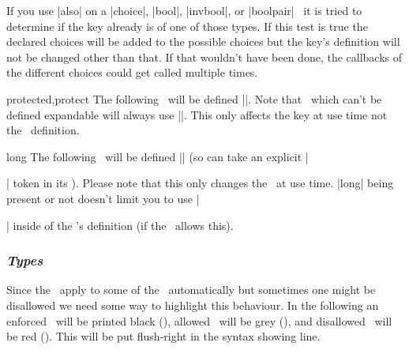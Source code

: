 If you use |also| on a |choice|, |bool|, |invbool|, or |boolpair| \key\ it is
tried to determine if the key already is of one of those types. If this test is
true the declared choices will be added to the possible choices but the key's
definition will not be changed other than that. If that wouldn't have been done,
the callbacks of the different choices could get called multiple times.

\begin{function}[module=expkv-def prefix]{protected,protect}
  The following \key\ will be defined |\protected|. Note that \types\ which
  can't be defined expandable will always use |\protected|. This only affects
  the key at use time not the \key\ definition.
\end{function}

\begin{function}[module=expkv-def prefix]{long}
  The following \key\ will be defined |\long| (so can take an explicit |\par|
  token in its \val). Please note that this only changes the \key\ at use time.
  |long| being present or not doesn't limit you to use |\par| inside of the
  \key's definition (if the \type\ allows this).
\end{function}


\subsubsection{\textit{Types}\label{sec:d:types}}

Since the \prefixes\ apply to some of the \types\ automatically but sometimes
one might be disallowed we need some way to highlight this behaviour. In the
following an enforced \prefix\ will be printed black
(\texttt{}), allowed \prefixes\ will be grey
(\texttt{}), and disallowed \prefixes\ will be red
(\texttt{}). This will be put flush-right in the syntax
showing line.

